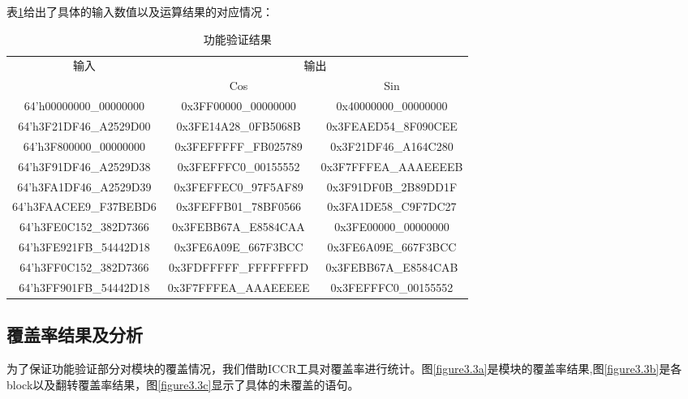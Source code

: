 \documentclass[a4paper,12pt]{report}
\begin{document}
表\ref{table1}给出了具体的输入数值以及运算结果的对应情况：
\begin{table}[!hbtp]
\centering
\caption{功能验证结果}
\label{table1}
\begin{tabular}{ccc}
\toprule
\multirow{2}{*}{输入} & \multicolumn{2}{c}{输出} \\
\cline{2-3}
 &  Cos   & Sin \\
\midrule
64'h00000000\_00000000  & 0x3FF00000\_00000000  & 0x40000000\_00000000 \\
64'h3F21DF46\_A2529D00  & 0x3FE14A28\_0FB5068B  & 0x3FEAED54\_8F090CEE \\
64'h3F800000\_00000000  & 0x3FEFFFFF\_FB025789  & 0x3F21DF46\_A164C280 \\
64'h3F91DF46\_A2529D38  & 0x3FEFFFC0\_00155552  & 0x3F7FFFEA\_AAAEEEEB \\
64'h3FA1DF46\_A2529D39  & 0x3FEFFEC0\_97F5AF89  & 0x3F91DF0B\_2B89DD1F \\ 
64'h3FAACEE9\_F37BEBD6  & 0x3FEFFB01\_78BF0566  & 0x3FA1DE58\_C9F7DC27 \\ 
64'h3FE0C152\_382D7366  & 0x3FEBB67A\_E8584CAA  & 0x3FE00000\_00000000 \\
64'h3FE921FB\_54442D18  & 0x3FE6A09E\_667F3BCC  & 0x3FE6A09E\_667F3BCC \\
64'h3FF0C152\_382D7366  & 0x3FDFFFFF\_FFFFFFFD  & 0x3FEBB67A\_E8584CAB \\
64'h3FF901FB\_54442D18  & 0x3F7FFFEA\_AAAEEEEE  & 0x3FEFFFC0\_00155552 \\
\bottomrule

\end{tabular}
\end{table}

\subsection{覆盖率结果及分析}
为了保证功能验证部分对模块的覆盖情况，我们借助ICCR工具对覆盖率进行统计。图\ref{figure3.3a}是模块的覆盖率结果,图\ref{figure3.3b}是各block以及翻转覆盖率结果，图\ref{figure3.3c}显示了具体的未覆盖的语句。
\end{document}
